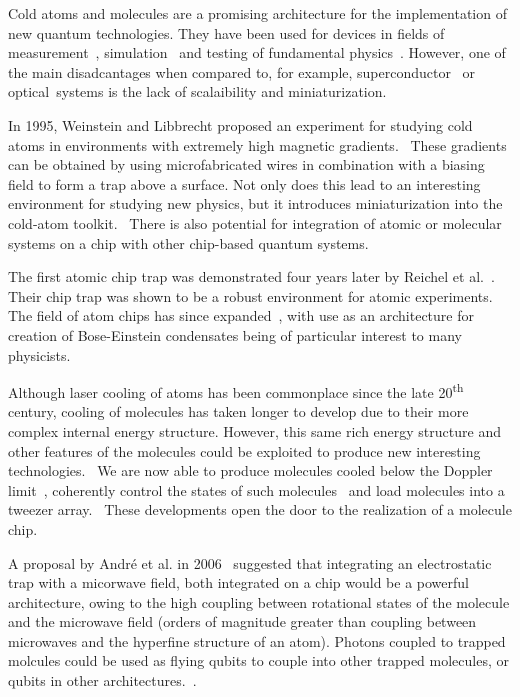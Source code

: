 Cold atoms and molecules are a promising architecture for the implementation of
new quantum technologies. They have been used for devices in fields of
measurement~\cite{Campbell90}, simulation~\cite{Gross995} and testing of
fundamental physics~\cite{DeMille990}. However, one of the
main disadcantages when compared to, for example,
superconductor~\cite{Wallraff2004} or
optical~\cite{Browne2017}systems is the lack of
scalaibility and miniaturization.~\cite{nielsenandchuang}

In 1995, Weinstein and Libbrecht proposed an experiment for
studying cold atoms in environments with extremely high magnetic
gradients.~\cite{PhysRevA.52.4004} These gradients can be obtained by using
microfabricated wires in combination with a biasing field to form a trap above
a surface. Not only does this lead to an interesting environment for studying
new physics, but it introduces miniaturization into the cold-atom
toolkit.~\cite{2011Ac} There is also potential for integration of atomic or
molecular systems on a chip with other chip-based quantum
systems.~\cite{2011Ac, Kubo2011}

The first atomic chip trap was demonstrated four years later by Reichel et
al.~\cite{Reichel1999}. Their chip trap was shown to be a robust environment for
atomic experiments. The field of atom chips has since expanded~\cite{2011Ac},
with use as an architecture for creation of Bose-Einstein condensates being of
particular interest to many physicists.~\cite{Ott2001}

Although laser cooling of atoms has been commonplace since the late
20\textsuperscript{th} century, cooling of molecules has taken longer to develop
due to their more complex internal energy structure. However, this same rich
energy structure and other features of the molecules could be exploited to
produce new interesting technologies.~\cite{Tarbutt2018} We are now able to
produce \CaF molecules cooled below the Doppler limit~\cite{Truppe2017},
coherently control the states of such molecules~\cite{PhysRevLett.120.163201}
and load molecules into a tweezer array.~\cite{Anderegg2019} These developments
open the door to the realization of a molecule chip.

A proposal by Andr\'e et al. in 2006~\cite{Andre2006} suggested that integrating
an electrostatic trap with a micorwave field, both integrated on a chip would be
a powerful architecture, owing to the high coupling between rotational states of
the molecule and the microwave field (orders of magnitude greater than coupling
between microwaves and the hyperfine structure of an atom). Photons coupled to
trapped molcules could be used as flying qubits to couple into other trapped
molecules, or qubits in other architectures.~\cite{PhysRevLett.92.063601}.

